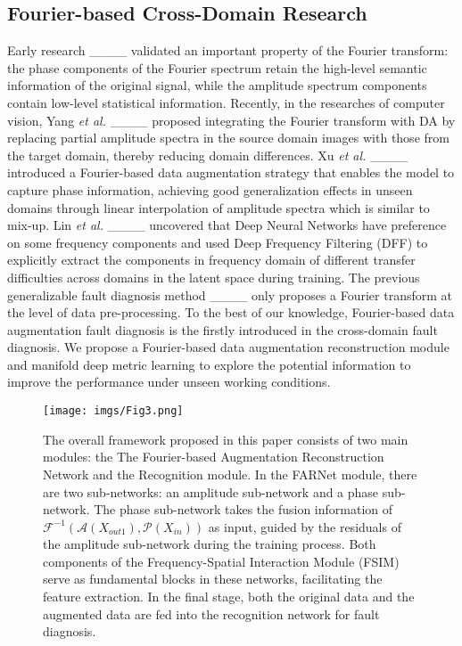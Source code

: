 \subsection{Fourier-based Cross-Domain Research}
Early research ____ validated an important property of the Fourier transform: the phase components of the Fourier spectrum retain the high-level semantic information of the original signal, while the amplitude spectrum components contain low-level statistical information. Recently, in the researches of computer vision, Yang \textit{et al.} ____ proposed integrating the Fourier transform with DA by replacing partial amplitude spectra in the source domain images with those from the target domain, thereby reducing domain differences. Xu \textit{et al.} ____ introduced a Fourier-based data augmentation strategy that enables the model to capture phase information, achieving good generalization effects in unseen domains through linear interpolation of amplitude spectra which is similar to mix-up. Lin \textit{et al.} ____ uncovered that Deep Neural Networks have preference on some frequency components and used Deep Frequency Filtering (DFF) to explicitly extract the components in frequency domain of different transfer difficulties across domains in the latent space during training. The previous generalizable fault diagnosis method ____ only proposes a Fourier transform at the level of data pre-processing. To the best of our knowledge, Fourier-based data augmentation fault diagnosis is the firstly introduced in the cross-domain fault diagnosis. We propose a Fourier-based data augmentation reconstruction module and manifold deep metric learning to explore the potential information to improve the performance under unseen working conditions.


\begin{figure*}[ht]
\centerline{\texttt{[image: imgs/Fig3.png]}}\caption{The overall framework proposed in this paper consists of two main modules: the The Fourier-based Augmentation Reconstruction Network and the Recognition module. In the FARNet module, there are two sub-networks: an amplitude sub-network and a phase sub-network. The phase sub-network takes the fusion information of $\mathcal{F}^{-1}(\mathcal{A}(X_{out1}),\mathcal{P}(X_{in}))$ as input, guided by the residuals of the amplitude sub-network during the training process. Both components of the Frequency-Spatial Interaction Module (FSIM) serve as fundamental blocks in these networks, facilitating the feature extraction. In the final stage, both the original data and the augmented data are fed into the recognition network for fault diagnosis.}
\label{fig3}
\end{figure*}